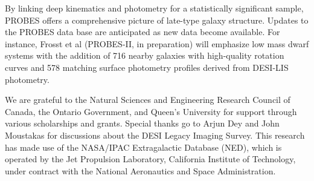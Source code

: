 \documentclass[twocolumn]{aastex631}
\begin{document}
By linking deep kinematics and photometry for a statistically significant sample, PROBES offers a comprehensive picture of late-type galaxy structure.
Updates to the PROBES data base are anticipated as new data become available.
For instance, Frosst et al (PROBES-II, in preparation) will emphasize low mass dwarf systems with the addition of 716 nearby galaxies with high-quality rotation curves and 578 matching surface photometry profiles derived from DESI-LIS photometry. 

\begin{acknowledgments}
We are grateful to the Natural Sciences and Engineering Research Council of Canada, the Ontario Government, and Queen's University for support through various scholarships and grants.
Special thanks go to Arjun Dey and John Moustakas for discussions about the DESI Legacy Imaging Survey.
This research has made use of the NASA/IPAC Extragalactic Database (NED),
which is operated by the Jet Propulsion Laboratory, California Institute of Technology, under contract with the National Aeronautics and Space Administration.

\end{acknowledgments}

\vspace{5mm}




\end{document}
